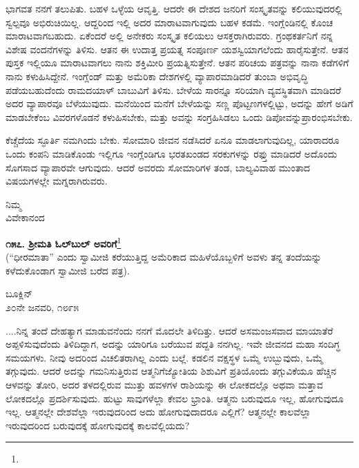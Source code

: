 ಭಾಗವತ ನನಗೆ ತಲುಪಿತು. ಬಹಳ ಒಳ್ಳೆಯ ಆವೃತ್ತಿ. ಆದರೇ ಈ ದೇಶದ ಜನರಿಗೆ ಸಂಸ್ಕೃತವನ್ನು ಕಲಿಯುವುದರಲ್ಲಿ ಸ್ವಲ್ಪವೂ ಅಭಿರುಚಿಯಿಲ್ಲ. ಆದ್ದರಿಂದ ಇಲ್ಲಿ ಅದರ ಮಾರಾಟವಾಗುವುದು ಬಹಳ ಕಡಮೆ. ಇಂಗ್ಲೆಂಡಿನಲ್ಲಿ ಕೊಂಚ ಮಾರಾಟವಾಗಬಹುದು. ಏಕೆಂದರೆ ಅಲ್ಲಿ ಅನೇಕರು ಸಂಸ್ಕೃತ ಕಲಿಯಲು ಆಸಕ್ತರಾಗಿರುವರು. ಗ್ರಂಥಕರ್ತನಿಗೆ ನನ್ನ ವಿಶೇಷ ವಂದನೆಗಳನ್ನು ತಿಳಿಸು. ಆತನ ಈ ಉದಾತ್ತ ಪ್ರಯತ್ನ ಸಂಪೂರ್ಣ ಯಶಸ್ವಿಯಾಗಲೆಂದು ಹಾರೈಸುತ್ತೇನೆ. ಆತನ ಪುಸ್ತಕ ಇಲ್ಲಿಯೂ ಮಾರಾಟವಾಗಲು ನಾನು ಶಕ್ತಿಮೀರಿ ಪ್ರಯತ್ನಿಸುತ್ತೇನೆ. ಆತನ ಪರಿಚಯ ಪತ್ರವನ್ನು ನಾನಾ ಕಡೆಗಳಿಗೆ ನಾನು ಕಳುಹಿಸಿದ್ದೇನೆ. ಇಂಗ್ಲೆಂಡ್ ಮತ್ತು ಅಮೆರಿಕಾ ದೇಶಗಳಲ್ಲಿ ವ್ಯಾಪಾರಮಾಡಿದರೆ ತುಂಬಾ ಅಭಿವೃದ್ಧಿ ಪಡೆಯಬಹುದೆಂದು ರಾಮದಯಾಳ್ ಬಾಬುವಿಗೆ ತಿಳಿಸು. ಬೇಳೆಯ ಸಾರನ್ನೂ ಸರಿಯಾಗಿ ವ್ಯವಸ್ಥಿತವಾಗಿ ಮಾಡಿದರೆ ಅದರ ವ್ಯಾಪಾರವೂ ಬೆಳೆಯುವುದು. ಮನೆಯಿಂದ ಮನೆಗೆ ಬೇಳೆಯನ್ನು ಸಣ್ಣ ಪೊಟ್ಟಣಗಳಲ್ಲಿಟ್ಟು, ಅದನ್ನು ಹೇಗೆ ಅಡಿಗೆ ಮಾಡಬೇಕೆಂಬ ವಿವರ\break ಗಳೊಡನೆ ಕಳುಹಿಸಬೇಕು, ಮತ್ತು ಅವನ್ನು ಸಂಗ್ರಹಿಸಿಡಲು ಒಂದು ಡಿಪೋವನ್ನು\break ಪ್ರಾರಂಭಿಸಬೇಕು.

ಕೆಚ್ಚೆದೆಯ ಸ್ಫೂರ್ತಿ ನಮಗಿಂದು ಬೇಕು. ಸೋಮಾರಿ ಜೀವನ ನಡೆಸಿದರೆ ಏನೂ ಮಾಡಲಾಗುವುದಿಲ್ಲ, ಯಾರಾದರೂ ಒಂದು ಕಂಪನಿ ಮಾಡಿಕೊಂಡು ಇಲ್ಲಿಗೂ ಇಂಗ್ಲೆಂಡಿಗೂ ಭರತಖಂಡದ ಸರಕುಗಳನ್ನು ರಫ್ತು ಮಾಡಿದರೆ ಅದೊಂದು ಸೊಗಸಾದ ವ್ಯಾಪಾರವೇ ಆಗುವುದು. ಆದರೆ ಅವರದು ಸೋಮಾರಿಗಳ ತಂಡ, ಬಾಲ್ಯವಿವಾಹ ಮುಂತಾದ ವಿಷಯಗಳಲ್ಲೇ ಮಗ್ನರಾಗಿರುವರು.

\vspace{-0.7cm}

{\flushright
ನಿಮ್ಮ\\ವಿವೇಕಾನಂದ\par}

\begin{center}
\textbf{೧೫೭. ಶ‍್ರೀಮತಿ ಓಲ್‌ಬುಲ್ ಅವರಿಗೆ}\footnote{}\\ (“ಧೀರಮಾತಾ” ಎಂದು ಸ್ವಾಮೀಜಿ ಕರೆಯುತ್ತಿದ್ದ ಅಮೆರಿಕಾದ ಮಹಿಳೆಯೊಬ್ಬಳಿಗೆ ಅವಳು ತನ್ನ ತಂದೆಯನ್ನು ಕಳೆದುಕೊಂಡಾಗ ಸ್ವಾಮೀಜಿ ಬರೆದ ಪತ್ರ).
\end{center}

\vspace{-0.7cm}

\begin{flushright}
ಬೂಕ್ಲಿನ್\\೨೦ನೇ ಜನವರಿ, ೧೮೯೫
\end{flushright}

....ನಿನ್ನ ತಂದೆ ದೇಹತ್ಯಾಗ ಮಾಡುವನೆಂದು ನನಗೆ ಮೊದಲೇ ತಿಳಿದಿತ್ತು. ಆದರೆ ಅಸಮಂಜಸವಾದ ಮಾಯಾತೆರೆ ಅಪ್ಪಳಿಸುವುದೆಂದು ತಿಳಿದಿದ್ದಾಗ, ಅದನ್ನು ಯಾರಿಗೂ ಬರೆಯುವ ಪದ್ದತಿ ನನಗಿಲ್ಲ. ಇವೇ ಜೀವನದ ಮಹಾ ಸಂದಿಗ್ಧ ಸಮಯಗಳು. ನೀವು ಅದರಿಂದ ವಿಚಲಿತರಾಗಿಲ್ಲ ಎಂದು ಬಲ್ಲೆ. ಕಡಲಿನ ವಕ್ಷಸ್ಥಳ ಒಮ್ಮೆ ಉಬ್ಬುವುದು, ಒಮ್ಮೆ ತಗ್ಗುವುದು. ಆದರೆ ಅದನ್ನು ಗಮನಿಸುತ್ತಿರುವ ಆತ್ಮನಿಗೆ\enginline{-}ಜ್ಯೋತಿಯ ಶಿಶುವಿಗೆ\enginline{-} ಪ್ರತಿಯೊಂದು ತಗ್ಗುವಿಕೆಯೂ ಹೆಚ್ಚಿನ ಆಳವನ್ನು ತೋರಿ, ಅದರ ತಳದಲ್ಲಿರುವ ಮುತ್ತು ಹವಳಗಳ ರಾಶಿಯನ್ನು ಈ ಲೋಕದಲ್ಲೊ ಅಥವಾ ಮತ್ತಾವ ಲೋಕದಲ್ಲೊ ಪ್ರದರ್ಶಿಸುವುದು. ಹುಟ್ಟು ಸಾವುಗಳೆಲ್ಲಾ ಕೇವಲ ಭ್ರಾಂತಿ. ಆತ್ಮನು ಬರುವುದೂ ಇಲ್ಲ, ಹೋಗುವುದೂ ಇಲ್ಲ. ಆತ್ಮನಲ್ಲೇ ದೇಶವೆಲ್ಲಾ ಇರುವುದರಿಂದ ಅದು ಹೋಗುವುದಾದರೂ ಎಲ್ಲಿಗೆ? ಆತ್ಮನಲ್ಲೇ ಕಾಲವೆಲ್ಲಾ ಇರುವುದರಿಂದ ಬರುವುದಕ್ಕೆ ಹೋಗುವುದಕ್ಕೆ ಕಾಲವೆಲ್ಲಿಯದು?


